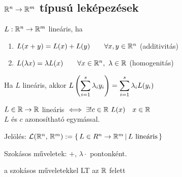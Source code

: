 \subsection{$\mathbb{R}^n\to\mathbb{R}^m$ típusú leképezések}
\begin{de}
  $L: \mathbb{R}^n\to\mathbb{R}^m$ lineáris, ha
{\listazjromai
\begin{enumerate}
  \item $L(x + y) = L(x) + L(y)\qquad \forall x,y\in \mathbb{R}^n$ (additivitás)
  \item $L(\lambda x) = \lambda L(x)\qquad \forall x\in\mathbb{R}^n,\ \lambda\in\mathbb{R}$ (homogenitás)  
\end{enumerate}
}
\end{de}

\begin{Megj}
\item Ha $L$ lineáris, akkor $\displaystyle L\left(\sum_{i=1}^s \lambda_i y_i\right) = \sum_{i=1}^s\lambda_i L(y_i)$
\item $L\in\mathbb{R}\to\mathbb{R}$ lineáris $\ekviv \exists!c\in \R\ L(x)\quad  x\in\R$\\
  $L$ és $c$ azonosítható egymással.
\item  Jelölés: $\mathcal{L}(\mathbb{R}^n,\,\mathbb{R}^m) :=  \{\,L\in R^n\to\mathbb{R}^m\,|\,L\text{ lineáris}\,\}$
\item  Szokásos műveletek: $+$, $\lambda\cdot$ pontonként.
\end{Megj}

\begin{te}
  \Linearis a szokásos műveletekkel LT az $\mathbb{R}$ felett
\end{te}

